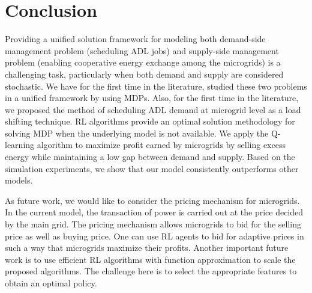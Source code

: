 \documentclass[conference]{IEEEtran}
\begin{document}
\section{Conclusion}\label{sec:conclusion}
Providing a unified solution framework for modeling both demand-side management problem (scheduling ADL jobs) and supply-side management problem (enabling cooperative energy exchange among the microgrids) is a challenging task, particularly when both demand and supply are considered stochastic. We have for the first time in the literature, studied these two problems in a unified framework by using MDPs. Also, for the first time in the literature, we proposed the method of scheduling ADL demand at microgrid level as a load shifting technique. RL algorithms provide an optimal solution methodology for solving MDP when the underlying model is not available. We apply the Q-learning algorithm to maximize profit earned by microgrids by selling excess energy while maintaining a low gap between demand and supply. Based on the simulation experiments, we show that our model consistently outperforms other models.

As future work, we would like to consider the pricing mechanism for microgrids. In the current model, the transaction of power is carried out at the price decided by the main grid. The pricing mechanism allows microgrids to bid for the selling price as well as buying price. One can use RL agents to bid for adaptive prices in such a way that microgrids maximize their profits. Another important future work is to use efficient RL algorithms with function approximation to scale the proposed algorithms.  The challenge here is to select the appropriate features to obtain an optimal policy.




 
 
\end{document}
